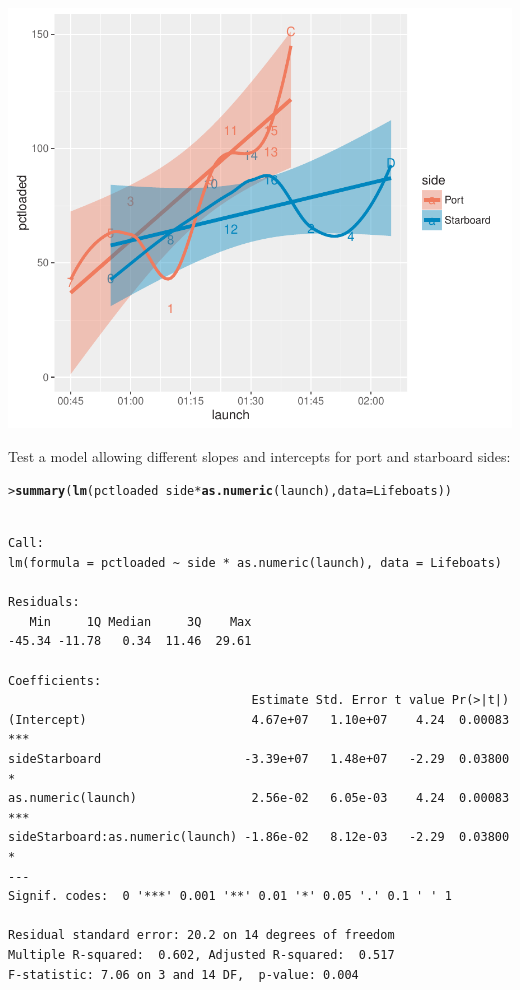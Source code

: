 \documentclass[10pt]{report}\usepackage[]{graphicx}\usepackage[]{color}
\makeatletter
\newcommand{\hlopt}[1]{\textcolor[rgb]{0,0,0}{#1}}%
\newcommand{\hlstd}[1]{\textcolor[rgb]{0.345,0.345,0.345}{#1}}%
\newcommand{\hlkwc}[1]{\textcolor[rgb]{0.333,0.667,0.333}{#1}}%
\newcommand{\hlkwd}[1]{\textcolor[rgb]{0.737,0.353,0.396}{\textbf{#1}}}%
\newenvironment{kframe}{%
 \def\at@end@of@kframe{}%
 \ifinner\ifhmode%
  \def\at@end@of@kframe{\end{minipage}}%
  \begin{minipage}{\columnwidth}%
 \fi\fi%
 \def\FrameCommand##1{\hskip\@totalleftmargin \hskip-\fboxsep
 \colorbox{shadecolor}{##1}\hskip-\fboxsep
     \hskip-\linewidth \hskip-\@totalleftmargin \hskip\columnwidth}%
 \MakeFramed {\advance\hsize-\width
   \@totalleftmargin\z@ \linewidth\hsize
   \@setminipage}}%
 {\par\unskip\endMakeFramed%
 \at@end@of@kframe}
\newenvironment{knitrout}{}{} %
\renewenvironment{knitrout}{\small\renewcommand{\baselinestretch}{.85}}{} %
\makeatother
\begin{document}
\begin{Exercises}
\begin{enumerate*}
\begin{ans}
\begin{knitrout}
\centerline{\includegraphics[width=.5\textwidth]{soln/fig/ex4_9b-1} }



\end{knitrout}
      Test a model allowing different slopes and intercepts for port and starboard sides:
\begin{knitrout}\footnotesize
{}\color{fgcolor}\begin{kframe}
\begin{alltt}
\hlstd{> }\hlkwd{summary}\hlstd{(}\hlkwd{lm}\hlstd{(pctloaded} \hlopt{~} \hlstd{side} \hlopt{*} \hlkwd{as.numeric}\hlstd{(launch),} \hlkwc{data}\hlstd{=Lifeboats))}
\end{alltt}
\begin{verbatim}

Call:
lm(formula = pctloaded ~ side * as.numeric(launch), data = Lifeboats)

Residuals:
   Min     1Q Median     3Q    Max 
-45.34 -11.78   0.34  11.46  29.61 

Coefficients:
                                  Estimate Std. Error t value Pr(>|t|)    
(Intercept)                       4.67e+07   1.10e+07    4.24  0.00083 ***
sideStarboard                    -3.39e+07   1.48e+07   -2.29  0.03800 *  
as.numeric(launch)                2.56e-02   6.05e-03    4.24  0.00083 ***
sideStarboard:as.numeric(launch) -1.86e-02   8.12e-03   -2.29  0.03800 *  
---
Signif. codes:  0 '***' 0.001 '**' 0.01 '*' 0.05 '.' 0.1 ' ' 1

Residual standard error: 20.2 on 14 degrees of freedom
Multiple R-squared:  0.602,	Adjusted R-squared:  0.517 
F-statistic: 7.06 on 3 and 14 DF,  p-value: 0.004
\end{verbatim}
\end{kframe}
\end{knitrout}
      \end{ans}
      
    \end{enumerate*}

\end{Exercises}
\end{document}
